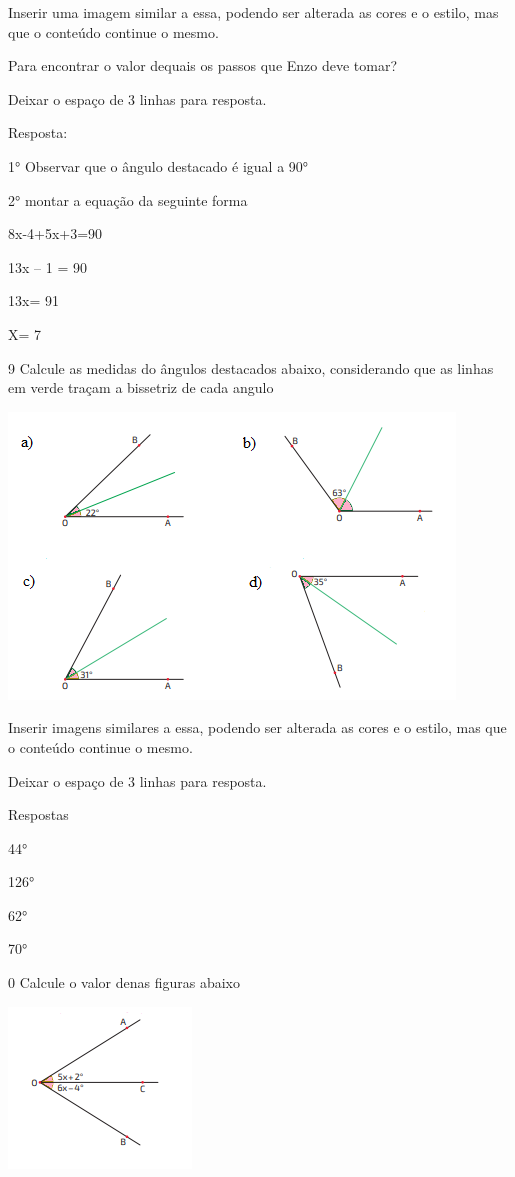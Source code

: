 Inserir uma imagem similar a essa, podendo ser alterada as cores e o
estilo, mas que o conteúdo continue o mesmo.

Para encontrar o valor de\times quais os passos que Enzo deve tomar?

Deixar o espaço de 3 linhas para resposta.

Resposta:

1° Observar que o ângulo destacado é igual a 90°

2° montar a equação da seguinte forma

8x-4+5x+3=90

13x -- 1 = 90

13x= 91

X= 7

\num{9} Calcule as medidas do ângulos destacados abaixo, considerando que as
linhas em verde traçam a bissetriz de cada angulo

\includegraphics[width=4\times 66667in,height=3in]{./imgSAEB_8_MAT/media/image32.png}

Inserir imagens similares a essa, podendo ser alterada as cores e o
estilo, mas que o conteúdo continue o mesmo.

Deixar o espaço de 3 linhas para resposta.

Respostas

\item 44°
\item 126°
\item 62°
\item 70°

\num{0} Calcule o valor de\times nas figuras abaixo

\includegraphics[width=1\times 91667in,height=1\times 6875in]{./imgSAEB_8_MAT/media/image33.png}

